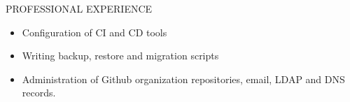 \documentclass{resume} %
\begin{document}
\begin{rSection}{PROFESSIONAL EXPERIENCE}
\begin{rSubsection}
\begin{rSubsection}
\begin{itemize}
    \item Configuration of CI and CD tools
      
    \item Writing backup, restore and migration scripts

    \item Administration of Github organization repositories,
      email, LDAP and DNS records.

    \end{itemize}






    

    


\end{rSubsection}
\end{rSubsection}
\end{rSection}
\end{document}
